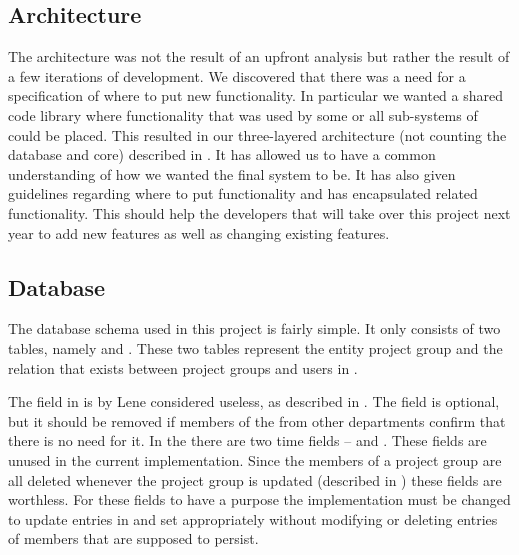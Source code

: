 \subsection{Architecture}



The architecture was not the result of an upfront analysis but rather the result of a few iterations of development.
We discovered that there was a need for a specification of where to put new functionality.
In particular we wanted a shared code library where functionality that was used by some or all sub-systems of \system{} could be placed.
This resulted in our three-layered architecture (not counting the database and \moodle{} core) described in .
It has allowed us to have a common understanding of how we wanted the final system to be.
It has also given guidelines regarding where to put functionality and has encapsulated related functionality.
This should help the developers that will take over this project next year to add new features as well as changing existing features.



\subsection{Database}
The database schema used in this project is fairly simple.
It only consists of two tables, namely   and . 
These two tables represent the entity project group and the relation that exists between project groups and users in \moodle{}. 

The  field in  is by Lene considered useless, as described in . 
The field is optional, but it should be removed if members of the \admpers{} from other departments confirm that there is no need for it. 
In the  there are two time fields --  and . 
These fields are unused in the current implementation. 
Since the members of a project group are all deleted whenever the project group is updated (described in ) these fields are worthless.
For these fields to have a purpose the implementation must be changed to update entries in  and set  appropriately without modifying  or deleting entries of members that are supposed to persist.


